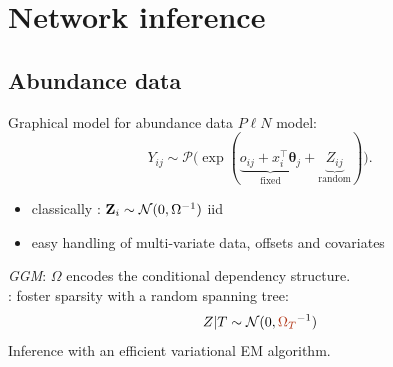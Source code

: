 \documentclass[11pt]{beamer}
\newcommand\thetab{{\boldsymbol{\theta}}}
\newcommand\Zb{{\bf Z}}
\newcommand{\emphase}[1]{\textcolor{Complement}{#1}}
\begin{document}
\section{Network inference}
\subsection{Abundance data}
\begin{frame}{Graphical model for abundance data}
$P\ell N$ model:
   \large{ $$ Y_{ij} \sim \mathcal{P}\big(\exp(\underbrace{o_{ij} + x_i^\intercal \thetab_j}_{\text{fixed}} + \underbrace{Z_{ij}}_{\text{random}})\big).$$} \normalsize 
     \pause
   \begin{itemize}
       \item classically \citep{AiH89}: $ \Zb_i \sim\mathcal{N}(0,\Omega^{-1})$ iid
       \item easy handling of multi-variate data, offsets and covariates
   \end{itemize}
   \bigskip
     \textit{GGM}: $\Omega$ encodes the \emphase{conditional dependency} structure.\\
   \pause
   \bigskip
   \citet{MRA20}: foster sparsity with a random spanning tree: $$Z|T \sim \mathcal{N}(0, \emphase{\Omega_T}^{-1}) $$
 Inference with an efficient variational EM algorithm.
\end{frame}

\end{document}
